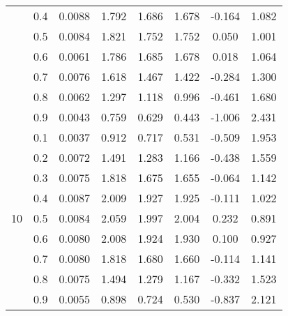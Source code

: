 \documentclass[11pt,a4paper]{report}
\begin{document}
\begin{longtable}{ | c | c || c | c | c | c | c | c | }
 & 0.4 & 0.0088 & 1.792 & 1.686 & 1.678 & -0.164 & 1.082 \\
 & 0.5 & 0.0084 & 1.821 & 1.752 & 1.752 & 0.050 & 1.001 \\
 & 0.6 & 0.0061 & 1.786 & 1.685 & 1.678 & 0.018 & 1.064 \\
 & 0.7 & 0.0076 & 1.618 & 1.467 & 1.422 & -0.284 & 1.300 \\
 & 0.8 & 0.0062 & 1.297 & 1.118 & 0.996 & -0.461 & 1.680 \\
 & 0.9 & 0.0043 & 0.759 & 0.629 & 0.443 & -1.006 & 2.431 \\
 \hline
\multirow{9}{*}{10} & 0.1 & 0.0037 & 0.912 & 0.717 & 0.531 & -0.509 & 1.953 \\
 & 0.2 & 0.0072 & 1.491 & 1.283 & 1.166 & -0.438 & 1.559 \\
 & 0.3 & 0.0075 & 1.818 & 1.675 & 1.655 & -0.064 & 1.142 \\
 & 0.4 & 0.0087 & 2.009 & 1.927 & 1.925 & -0.111 & 1.022 \\
 & 0.5 & 0.0084 & 2.059 & 1.997 & 2.004 & 0.232 & 0.891 \\
 & 0.6 & 0.0080 & 2.008 & 1.924 & 1.930 & 0.100 & 0.927 \\
 & 0.7 & 0.0080 & 1.818 & 1.680 & 1.660 & -0.114 & 1.141 \\
 & 0.8 & 0.0075 & 1.494 & 1.279 & 1.167 & -0.332 & 1.523 \\
 & 0.9 & 0.0055 & 0.898 & 0.724 & 0.530 & -0.837 & 2.121 \\
 \hline
\hline
\end{longtable}
\end{document}
